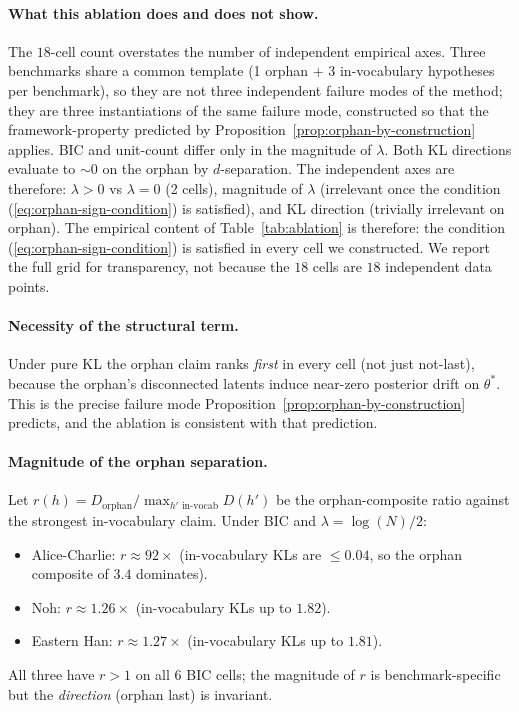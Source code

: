 \documentclass{article}
\begin{document}
\paragraph{What this ablation does and does not show.} The $18$-cell
count overstates the number of independent empirical axes. Three
benchmarks share a common template (1 orphan + 3 in-vocabulary
hypotheses per benchmark), so they are not three independent failure
modes of the method; they are three instantiations of the same
failure mode, constructed so that the framework-property predicted
by Proposition~\ref{prop:orphan-by-construction} applies. BIC and
unit-count differ only in the magnitude of $\lambda$. Both KL
directions evaluate to $\sim 0$ on the orphan by $d$-separation.
The independent axes are therefore:
$\lambda > 0$ vs $\lambda = 0$ (2 cells),
magnitude of $\lambda$ (irrelevant once the condition
(\ref{eq:orphan-sign-condition}) is satisfied),
and KL direction (trivially irrelevant on orphan).
The empirical content of Table~\ref{tab:ablation} is therefore: the
condition (\ref{eq:orphan-sign-condition}) is satisfied in every
cell we constructed. We report the full grid for transparency, not
because the $18$ cells are $18$ independent data points.

\paragraph{Necessity of the structural term.} Under pure KL the orphan
claim ranks \emph{first} in every cell (not just not-last), because
the orphan's disconnected latents induce near-zero posterior drift on
$\theta^{*}$. This is the precise failure mode
Proposition~\ref{prop:orphan-by-construction} predicts, and the
ablation is consistent with that prediction.

\paragraph{Magnitude of the orphan separation.} Let $r(h) =
D_{\mathrm{orphan}} / \max_{h' \text{ in-vocab}} D(h')$ be the
orphan-composite ratio against the strongest in-vocabulary claim.
Under BIC and $\lambda = \log(N)/2$:

\begin{itemize}[leftmargin=*, itemsep=0pt]
\item Alice-Charlie: $r \approx 92\times$ (in-vocabulary KLs are
$\leq 0.04$, so the orphan composite of $3.4$ dominates).
\item Noh: $r \approx 1.26\times$ (in-vocabulary KLs up to $1.82$).
\item Eastern Han: $r \approx 1.27\times$ (in-vocabulary KLs up to
$1.81$).
\end{itemize}
All three have $r > 1$ on all $6$ BIC cells; the magnitude of $r$
is benchmark-specific but the \emph{direction} (orphan last) is
invariant.
\end{document}

